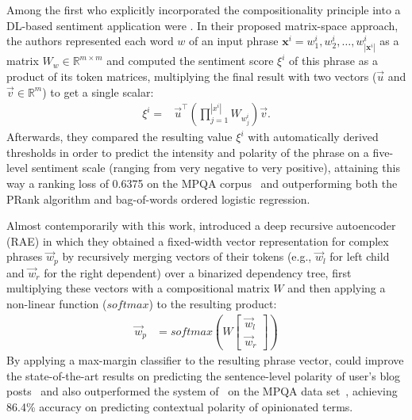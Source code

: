 Among the first who explicitly incorporated the compositionality
principle into a DL-based sentiment application were
\citet{Yessenalina:11}.  In their proposed matrix-space approach, the
authors represented each word $w$ of an input phrase $\mathbf{x}^i =
w^i_1, w^i_2, \ldots, w^i_{|\mathbf{x}^i|}$ as a matrix
$W_{w}\in\mathbb{R}^{m\times m}$ and computed the sentiment score
$\xi^i$ of this phrase as a product of its token matrices, multiplying
the final result with two vectors ($\vec{u}$ and
$\vec{v}\in\mathbb{R}^m$) to get a single scalar:
\begin{align*}
  \xi^i =& \vec{u}^\top\left(\prod_{j=1}^{|x^i|}W_{w^i_j}\right)\vec{v}.
\end{align*}
Afterwards, they compared the resulting value $\xi^i$ with
automatically derived thresholds in order to predict the intensity and
polarity of the phrase on a five-level sentiment scale (ranging from
very negative to very positive), attaining this way a ranking loss of
0.6375 on the MPQA corpus~\cite{Wiebe:05} and outperforming both the
PRank algorithm \cite{Crammer:01} and bag-of-words ordered logistic
regression.

Almost contemporarily with this work, \citet{Socher:11} introduced a
deep recursive autoencoder (RAE) in which they obtained a fixed-width
vector representation for complex phrases $\vec{w}_p$ by recursively
merging vectors of their tokens (e.g., $\vec{w}_l$ for left child and
$\vec{w}_r$ for the right dependent) over a binarized dependency tree,
first multiplying these vectors with a compositional matrix $W$ and
then applying a non-linear function ($softmax$) to the resulting
product:
\begin{align}
  \vec{w}_p &= softmax\left(W\begin{bmatrix}
      \vec{w}_l\\
      \vec{w}_r
  \end{bmatrix}\right)\label{cgsa:eq:socher-11}
\end{align}
By applying a max-margin classifier to the resulting phrase vector,
\citet{Socher:11} could improve the state-of-the-art results on
predicting the sentence-level polarity of user's blog
posts~\cite{Potts:10} and also outperformed the system
of~\citet{Nasukawa:03} on the MPQA data set~\cite{Wiebe:05}, achieving
86.4\% accuracy on predicting contextual polarity of opinionated
terms.

